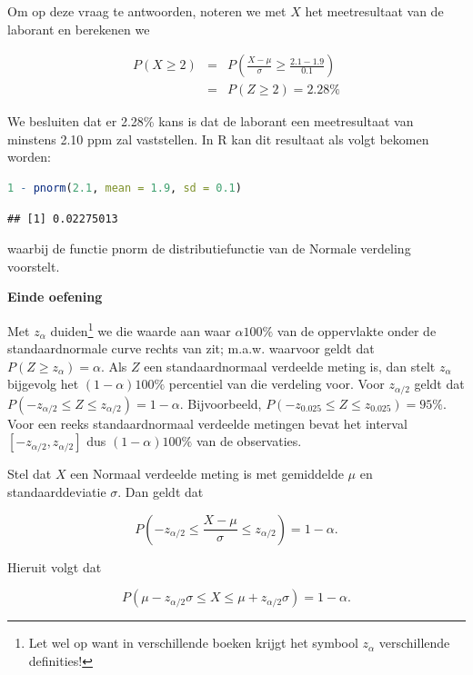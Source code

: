 \documentclass[
  12pt,dutch,coursenotes]{book}
\theoremstyle{definition}
\theoremstyle{definition}
\theoremstyle{definition}
\theoremstyle{definition}
\theoremstyle{remark}
\begin{document}
Om op deze vraag te antwoorden, noteren we met \(X\) het meetresultaat van de
laborant en berekenen we

\begin{eqnarray*}
P(X\geq 2)&=&P\left(\frac{X-\mu}{\sigma}\geq \frac{2.1-1.9}{0.1}\right) \\
&=&P(Z\geq 2) = 2.28\%
\end{eqnarray*}

We besluiten dat er 2.28\% kans is dat de laborant een meetresultaat van
minstens 2.10 ppm zal vaststellen. In R kan dit resultaat als volgt bekomen worden:

\begin{lstlisting}[language=R]
1 - pnorm(2.1, mean = 1.9, sd = 0.1)
\end{lstlisting}

\begin{lstlisting}
## [1] 0.02275013
\end{lstlisting}

waarbij de functie pnorm de distributiefunctie van de Normale verdeling voorstelt.

\textbf{Einde oefening}

Met \(z_{\alpha}\) duiden\footnote{Let wel op want in verschillende boeken krijgt het symbool \(z_{\alpha}\) verschillende definities!} we die waarde aan waar \(\alpha100\%\) van de
oppervlakte onder de standaardnormale curve rechts van zit; m.a.w. waarvoor
geldt dat \(P(Z \geq z_{\alpha}) = \alpha\). Als \(Z\) een standaardnormaal
verdeelde meting is, dan stelt \(z_{\alpha}\) bijgevolg het \((1-\alpha)100\%\)
percentiel van die verdeling voor. Voor \(z_{\alpha/2}\) geldt dat \(P(-z_{\alpha/2}\leq Z \leq z_{\alpha/2}) = 1-\alpha\). Bijvoorbeeld, \(P( - z_{0.025}\leq Z \leq z_{0.025}) = 95\%\). Voor een reeks standaardnormaal
verdeelde metingen bevat het interval \([-z_{\alpha/2},z_{\alpha/2}]\) dus \((1-\alpha)100\%\) van de observaties.

Stel dat \(X\) een Normaal verdeelde meting is met gemiddelde \(\mu\) en
standaarddeviatie \(\sigma\). Dan geldt dat

\begin{equation*}
P\left( - z_{\alpha/2}\leq \frac{X - \mu}{\sigma} \leq z_{\alpha/2}\right) =
1-\alpha .
\end{equation*}

Hieruit volgt dat

\begin{equation*}
P( \mu - z_{\alpha/2} \sigma \leq X \leq \mu + z_{\alpha/2} \sigma ) =
1-\alpha .
\end{equation*}
\end{document}
